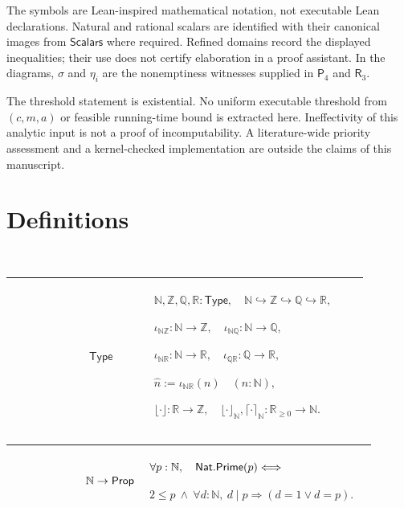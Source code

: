 \documentclass[12pt,reqno]{amsart}
\theoremstyle{blueplain}
\numberwithin{equation}{section}
\begin{document}
The symbols are Lean-inspired mathematical notation, not executable Lean
declarations. Natural and rational scalars are identified with their
canonical images from \hyperlink{def:Scalars}{$\mathsf{Scalars}$} where
required. Refined domains record the displayed inequalities; their use does
not certify elaboration in a proof assistant. In the diagrams, $\sigma$ and $%
\eta_i$ are the nonemptiness witnesses supplied in \hyperlink{row:P4}{$%
\mathsf{P}_4$} and \hyperlink{row:R3}{$\mathsf{R}_3$}.

The threshold statement is existential. No uniform executable threshold from 
$(c,m,a)$ or feasible running-time bound is extracted here. Ineffectivity of
this analytic input is not a proof of incomputability. A literature-wide
priority assessment and a kernel-checked implementation are outside the
claims of this manuscript.

\section{Definitions}

\label{sec:defs} {\ }

{\scriptsize \setlength{\parskip}{0pt}\nointerlineskip
\noindent 
\begin{tabular}{|@{}>{\centering\arraybackslash}m{0.19251\linewidth}|>{\centering\arraybackslash}m{0.16845\linewidth}|>{\centering\arraybackslash}m{0.53904\linewidth}|}
\hline
{\hypertarget{def:Scalars}{$\mathsf{Scalars}$}} & {$\mathsf{Type}$} & {$%
\displaystyle \mathbb{N},\mathbb{Z},\mathbb{Q},\mathbb{R}:\mathsf{Type},\quad%
\mathbb{N}\hookrightarrow\mathbb{Z}\hookrightarrow\mathbb{Q}\hookrightarrow%
\mathbb{R},$ \par$\displaystyle \iota_{\mathbb{N}\mathbb{Z}}:\mathbb{N}\to%
\mathbb{Z},\quad\iota_{\mathbb{N}\mathbb{Q}}:\mathbb{N}\to\mathbb{Q},$ \par$%
\displaystyle \iota_{\mathbb{N}\mathbb{R}}:\mathbb{N}\to\mathbb{R}%
,\quad\iota_{\mathbb{Q}\mathbb{R}}:\mathbb{Q}\to\mathbb{R},$ \par$%
\displaystyle \widehat n:=\iota_{\mathbb{N}\mathbb{R}}(n)\quad(n:\mathbb{N}%
), $ \par$\displaystyle \lfloor\cdot\rfloor:\mathbb{R}\to\mathbb{Z}%
,\quad\lfloor\cdot\rfloor_{\mathbb{N}},\lceil\cdot\rceil_{\mathbb{N}}:%
\mathbb{R}_{\ge0}\to\mathbb{N}.$} \\ \hline
\end{tabular}%
}

{\scriptsize \setlength{\parskip}{0pt}\nointerlineskip
\noindent 
\begin{tabular}{|@{}>{\centering\arraybackslash}m{0.19251\linewidth}|>{\centering\arraybackslash}m{0.16845\linewidth}|>{\centering\arraybackslash}m{0.53904\linewidth}|}
\hline
{\hypertarget{def:Nat.Prime}{$\mathsf{Nat.Prime}$}} & {$\mathbb{N}\to\mathsf{%
Prop}$} & {$\displaystyle \forall p:\mathbb{N},\quad \hyperlink{def:Nat.Prime}%
{\mathsf{Nat.Prime} }(p)\Longleftrightarrow$ \par$\displaystyle 2\le p\
\wedge\ \forall d:\mathbb{N},\ d\mid p\Rightarrow(d=1\vee d=p).$} \\ \hline
\end{tabular}%
}
\end{document}
